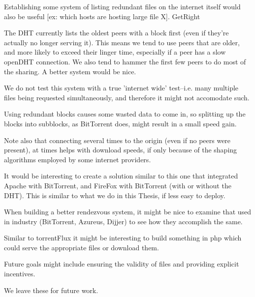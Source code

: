 Establishing some system of listing redundant files on the internet itself would also be useful [ex: which hosts are hosting large file X].  GetRight 

The DHT currently lists the oldest peers with a block first (even if they're actually no longer serving it).  This means we tend to use peers that are older, and more likely to exceed their linger time, especially if a peer has a slow openDHT connection.  We also tend to hammer the first few peers to do most of the sharing.  A better system would be nice.  

We do not test this system with a true 'internet wide' test--i.e. many multiple files being requested simultaneously, and therefore it might not accomodate such.

Using redundant blocks causes some wasted data to come in, so splitting up the blocks into subblocks, as BitTorrent does, might result in a small speed gain.

Note also that connecting several times to the origin (even if no peers were present), at times helps with download speeds, if only because of the shaping algorithms employed by some internet providers.

It would be interesting to create a solution similar to this one that integrated Apache with BitTorrent, and FireFox with BitTorrent (with or without the DHT).  This is similar to what we do in this Thesis, if less easy to deploy.

When building a better rendezvous system, it might be nice to examine that used in industry (BitTorrent, Azureus, Dijjer) to see how they accomplish the same.

Similar to torrentFlux\cite{torrentFlux} it might be interesting to build something in php which could serve the appropriate files or download them.

Future goals might include ensuring the validity of files and providing explicit incentives.

We leave these for future work.
